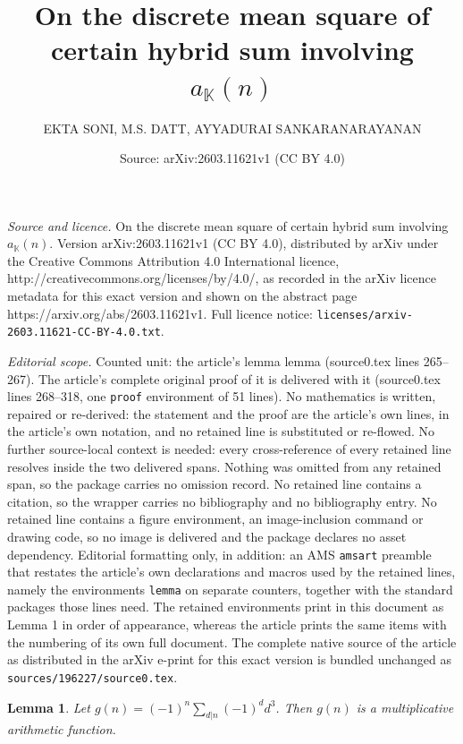 \documentclass[10pt,a4paper]{amsart}
\title{On the discrete mean square of certain hybrid sum involving $a_{\mathbb{K}}(n)$}
\author{EKTA SONI, M.S. DATT, AYYADURAI SANKARANARAYANAN}
\date{Source: arXiv:2603.11621v1 (CC BY 4.0)}
\newtheorem{lemma}{Lemma}
\begin{document}
\maketitle

\noindent\emph{Source and licence.} On the discrete mean square of certain hybrid sum involving $a_{\mathbb{K}}(n)$. Version arXiv:2603.11621v1 (CC BY 4.0), distributed by arXiv under the Creative Commons Attribution 4.0 International licence, http://creativecommons.org/licenses/by/4.0/, as recorded in the arXiv licence metadata for this exact version and shown on the abstract page https://arxiv.org/abs/2603.11621v1. Full licence notice: \texttt{licenses/arxiv-2603.11621-CC-BY-4.0.txt}.\par\smallskip

\noindent\textit{Editorial scope.} Counted unit: the article's lemma lemma (source0.tex lines 265--267). The article's complete original proof of it is delivered with it (source0.tex lines 268--318, one \texttt{proof} environment of 51 lines). No mathematics is written, repaired or re-derived: the statement and the proof are the article's own lines, in the article's own notation, and no retained line is substituted or re-flowed.  No further source-local context is needed: every cross-reference of every retained line resolves inside the two delivered spans.  Nothing was omitted from any retained span, so the package carries no omission record.  No retained line contains a citation, so the wrapper carries no bibliography and no bibliography entry.  No retained line contains a figure environment, an image-inclusion command or drawing code, so no image is delivered and the package declares no asset dependency.  Editorial formatting only, in addition: an AMS \texttt{amsart} preamble that restates the article's own declarations and macros used by the retained lines, namely the environments \texttt{lemma} on separate counters, together with the standard packages those lines need.  The retained environments print in this document as Lemma 1 in order of appearance, whereas the article prints the same items with the numbering of its own full document.  The complete native source of the article as distributed in the arXiv e-print for this exact version is bundled unchanged as \texttt{sources/196227/source0.tex}.
\begin{lemma}
	Let $g(n)=(-1)^{n}\sum_{d|n}(-1)^{d}d^{3}$. Then $g(n)$ is a multiplicative arithmetic function.
\end{lemma}
\end{document}
